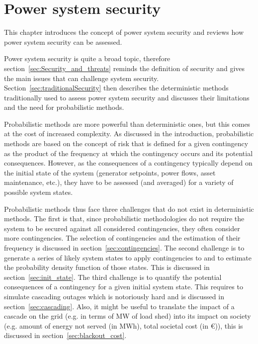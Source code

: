 \chapter{Power system security}
\label{ch:security}
\adjustmtc
\minitoc

This chapter introduces the concept of power system security and reviews how power system security can be assessed.

Power system security is quite a broad topic, therefore section~\ref{sec:Security_and_threats} reminds the definition of security and gives the main issues that can challenge system security. Section~\ref{sec:traditionalSecurity} then describes the deterministic methods traditionally used to assess power system security and discusses their limitations and the need for probabilistic methods.

Probabilistic methods are more powerful than deterministic ones, but this comes at the cost of increased complexity. As discussed in the introduction, probabilistic methods are based on the concept of risk that is defined for a given contingency as the product of the frequency at which the contingency occurs and its potential consequences. However, as the consequences of a contingency typically depend on the initial state of the system (generator setpoints, power flows, asset maintenance, etc.), they have to be assessed (and averaged) for a variety of possible system states.

Probabilistic methods thus face three challenges that do not exist in deterministic methods. The first is that, since probabilistic methodologies do not require the system to be secured against all considered contingencies, they often consider more contingencies. The selection of contingencies and the estimation of their frequency is discussed in section~\ref{sec:contingencies}. The second challenge is to generate a series of likely system states to apply contingencies to and to estimate the probability density function of those states. This is discussed in section~\ref{sec:init_state}. The third challenge is to quantify the potential consequences of a contingency for a given initial system state. This requires to simulate cascading outages which is notoriously hard and is discussed in section~\ref{sec:cascading}. Also, it might be useful to translate the impact of a cascade on the grid (e.g. in terms of MW of load shed) into its impact on society (e.g. amount of energy not served (in MWh), total societal cost (in €)), this is discussed in section~\ref{sec:blackout_cost}.

